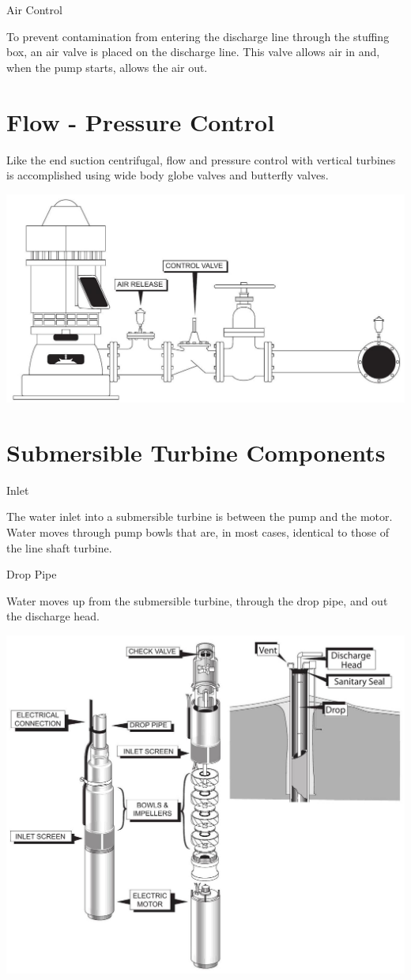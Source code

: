 \documentclass[10pt]{article}
\begin{document}
Air Control

To prevent contamination from entering the discharge line through the stuffing box, an air valve is placed on the discharge line. This valve allows air in and, when the pump starts, allows the air out.

\section{Flow - Pressure Control}
Like the end suction centrifugal, flow and pressure control with vertical turbines is accomplished using wide body globe valves and butterfly valves.

\includegraphics[max width=\textwidth]{VerticalTurbineFlowPressureControl}

\section{Submersible Turbine Components}
Inlet

The water inlet into a submersible turbine is between the pump and the motor. Water moves through pump bowls that are, in most cases, identical to those of the line shaft turbine.

Drop Pipe

Water moves up from the submersible turbine, through the drop pipe, and out the discharge head.

\includegraphics[max width=\textwidth]{SubmersibleTurbineComponents}
\end{document}

